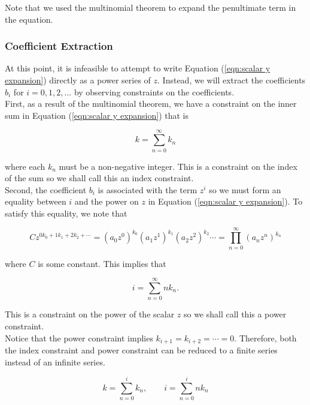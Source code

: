 Note that we used the multinomial theorem to expand the penultimate term in the equation.

\subsubsection{Coefficient Extraction}

At this point, it is infeasible to attempt to write Equation (\ref{eqn:scalar y expansion}) directly as a power series of $z$. Instead, we will extract the coefficients $b_i$ for $i = 0, 1, 2, \ldots$ by observing constraints on the coefficients.\\

First, as a result of the multinomial theorem, we have a constraint on the inner sum in Equation (\ref{eqn:scalar y expansion}) that is

\begin{equation}
	k = \sum_{n=0}^{\infty} k_n
	\label{eqn:scalar index constraint}
\end{equation}

where each $k_n$ must be a non-negative integer. This is a constraint on the index of the sum so we shall call this an index constraint.\\

Second, the coefficient $b_i$ is associated with the term $z^i$ so we must form an equality between $i$ and the power on $z$ in Equation (\ref{eqn:scalar y expansion}). To satisfy this equality, we note that

\begin{equation}
	C z^{0 k_0 + 1 k_1 + 2 k_2 + \cdots} = (a_0 z^0)^{k_0} (a_1 z^1)^{k_1} (a_2 z^2)^{k_2} \cdots = \prod_{n=0}^{\infty} (a_n z^n)^{k_n}
\end{equation}

where $C$ is some constant. This implies that

\begin{equation}
    i = \sum_{n=0}^{\infty} n k_n.
\end{equation}

This is a constraint on the power of the scalar $z$ so we shall call this a power constraint.\\

Notice that the power constraint implies $k_{i + 1} = k_{i + 2} = \cdots = 0$. Therefore, both the index constraint and power constraint can be reduced to a finite series instead of an infinite series.

\begin{equation}
	k = \sum_{n=0}^{i} k_n, \qquad i = \sum_{n=0}^{i} n k_n
\end{equation}

